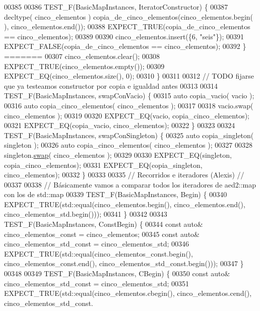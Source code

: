 \begin{DoxyCode}
00385 
00386 TEST\_F(BasicMapInstances, IteratorConstructor) \{
00387     decltype( cinco\_elementos ) copia\_de\_cinco\_elementos(cinco\_elementos.begin(
      ), cinco\_elementos.end());
00388     EXPECT\_TRUE(copia\_de\_cinco\_elementos == cinco\_elementos);
00389 
00390     cinco\_elementos.insert(\{6, \textcolor{stringliteral}{"seis"}\});
00391     EXPECT\_FALSE(copia\_de\_cinco\_elementos == cinco\_elementos);
00392 \}
=======
00307     cinco\_elementos.clear();
00308     EXPECT\_TRUE(cinco\_elementos.empty());
00309     EXPECT\_EQ(cinco\_elementos.size(), 0);
00310 \}
00311 
00312 \textcolor{comment}{// TODO fijarse que ya testeamos constructor por copia e igualdad antes}
00313 
00314 TEST\_F(BasicMapInstances, swapConVacio) \{
00315     \textcolor{keyword}{auto} copia\_vacio( vacio );
00316     \textcolor{keyword}{auto} copia\_cinco\_elementos( cinco\_elementos );
00317 
00318     vacio.swap( cinco\_elementos );
00319 
00320     EXPECT\_EQ(vacio, copia\_cinco\_elementos);
00321     EXPECT\_EQ(copia\_vacio, cinco\_elementos);
00322 \}
00323 
00324 TEST\_F(BasicMapInstances, swapConSingleton) \{
00325     \textcolor{keyword}{auto} copia\_singleton( singleton );
00326     \textcolor{keyword}{auto} copia\_cinco\_elementos( cinco\_elementos );
00327 
00328     singleton.\hyperlink{classaed2_1_1map_a43ddb71cc91e5c6021a7a1f243d6cc4a_a43ddb71cc91e5c6021a7a1f243d6cc4a}{swap}( cinco\_elementos );
00329 
00330     EXPECT\_EQ(singleton, copia\_cinco\_elementos);
00331     EXPECT\_EQ(copia\_singleton, cinco\_elementos);
00332 \}
00333 
00335 \textcolor{comment}{// Recorridos e iteradores (Alexis) //}
00337 \textcolor{comment}{}
00338 \textcolor{comment}{// Básicamente vamos a comparar todos los iteradores de aed2::map con los de std::map}
00339 TEST\_F(BasicMapInstances, Begin) \{
00340     EXPECT\_TRUE(std::equal(cinco\_elementos.begin(), cinco\_elementos.end(), cinco\_elementos\_std.begin()));
00341 \}
00342 
00343 TEST\_F(BasicMapInstances, ConstBegin) \{
00344     \textcolor{keyword}{const} \textcolor{keyword}{auto}& cinco\_elementos\_const = cinco\_elementos;
00345     \textcolor{keyword}{const} \textcolor{keyword}{auto}& cinco\_elementos\_std\_const = cinco\_elementos\_std;
00346     EXPECT\_TRUE(std::equal(cinco\_elementos\_const.begin(), cinco\_elementos\_const.end(), 
      cinco\_elementos\_std\_const.begin()));
00347 \}
00348 
00349 TEST\_F(BasicMapInstances, CBegin) \{
00350     \textcolor{keyword}{const} \textcolor{keyword}{auto}& cinco\_elementos\_std\_const = cinco\_elementos\_std;
00351     EXPECT\_TRUE(std::equal(cinco\_elementos.cbegin(), cinco\_elementos.cend(), cinco\_elementos\_std\_const.

\end{DoxyCode}
